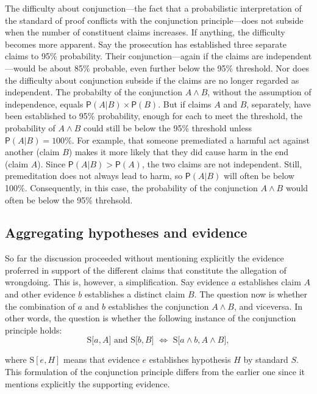 \documentclass[10pt,dvipsnames,enabledeprecatedfontcommands]{scrartcl}
\newcommand{\et}{\wedge}
\newcommand{\pr}[1]{\mathsf{P}(#1)}
\begin{document}
The difficulty about conjunction---the fact that a probabilistic
interpretation of the standard of proof conflicts with the conjunction
principle---does not subside when the number of constituent claims
increases. If anything, the difficulty becomes more apparent. Say the
prosecution has established three separate claims to 95\% probability.
Their conjunction---again if the claims are independent---would be about
85\% probable, even further below the 95\% threshold. Nor does the
difficulty about conjunction subside if the claims are no longer
regarded as independent. The probabilty of the conjunction \(A \et B\),
without the assumption of independence, equals
\(\pr{A | B} \times \pr{B}\). But if claims \(A\) and \(B\), separately,
have been established to 95\% probability, enough for each to meet the
threshold, the probability of \(A \et B\) could still be below the 95\%
threshold unless \(\pr{A | B}=100\%\). For example, that someone
premediated a harmful act against another (claim \(B\)) makes it more
likely that they did cause harm in the end (claim \(A\)). Since
\(\pr{A | B} > \pr{A}\), the two claims are not independent. Still,
premeditation does not always lead to harm, so \(\pr{A | B}\) will often
be below 100\%. Consequently, in this case, the probability of the
conjunction \(A \et B\) would often be below the 95\%
threhsold.

\subsection{Aggregating hypotheses and
evidence}\label{aggregating-hypotheses-and-evidence}

So far the discussion proceeded without mentioning explicitly the
evidence proferred in support of the different claims that constitute
the allegation of wrongdoing. This is, however, a simplification. Say
evidence \(a\) establishes claim \(A\) and other evidence \(b\)
establishes a distinct claim \(B\). The question now is whether the
combination of \(a\) and \(b\) establishes the conjunction \(A \et B\),
and viceversa. In other words, the question is whether the following
instance of the conjunction principle holds:
\[\text{S[$a, A$] and S[$b, B$] $\Leftrightarrow$ S[$a \wedge b, A\wedge B$]},\]

\noindent
where \(\text{S}[e, H]\) means that evidence \(e\) establishes
hypothesis \(H\) by standard \(S\). This formulation of the conjunction
principle differs from the earlier one since it mentions explicitly the
supporting evidence.
\end{document}
